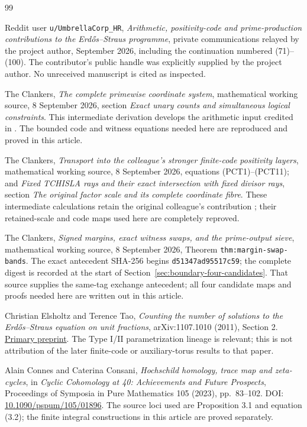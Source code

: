 \begin{thebibliography}{99}
\raggedright
{}
Reddit user \texttt{u/UmbrellaCorp\_HR},
\emph{Arithmetic, positivity-code and prime-production contributions to the
Erd\H{o}s--Straus programme}, private communications relayed by the project
author, September 2026, including the continuation numbered (71)--(100).
The contributor's public handle was explicitly supplied by the project author.
No unreceived manuscript is cited as inspected.

The Clankers, \emph{The complete primewise coordinate system},
mathematical working source, 8 September 2026, section
\emph{Exact unary counts and simultaneous logical constraints}.
This intermediate derivation develops the arithmetic input credited
in \cite{UmbrellaContribution}. The bounded code and witness equations
needed here are reproduced and proved in this article.

The Clankers, \emph{Transport into the colleague's stronger finite-code
positivity layers}, mathematical working source, 8 September 2026,
equations (PCT1)--(PCT11); and \emph{Fixed TCHISLA rays and their exact
intersection with fixed divisor rays}, section
\emph{The original factor scale and its complete coordinate fibre}.
These intermediate calculations retain the original colleague's contribution
\cite{UmbrellaContribution}; their retained-scale and code maps used here
are completely reproved.

The Clankers, \emph{Signed margins, exact witness swaps, and the
prime-output sieve}, mathematical working source, 8 September 2026,
Theorem \texttt{thm:margin-swap-bands}.
The exact antecedent SHA-256 begins \texttt{d51347ad95517c59};
the complete digest is recorded at the start of
Section~\ref{sec:boundary-four-candidates}.
That source supplies the same-tag exchange antecedent; all four
candidate maps and proofs needed here are written out in this article.

Christian Elsholtz and Terence Tao,
\emph{Counting the number of solutions to the Erd\H{o}s--Straus equation
on unit fractions}, arXiv:1107.1010 (2011), Section 2.
\href{https://arxiv.org/abs/1107.1010}{Primary preprint}.
The Type I/II parametrization lineage is relevant; this is not attribution
of the later finite-code or auxiliary-torus results to that paper.

Alain Connes and Caterina Consani,
\emph{Hochschild homology, trace map and zeta-cycles},
in \emph{Cyclic Cohomology at 40: Achievements and Future Prospects},
Proceedings of Symposia in Pure Mathematics 105 (2023), pp.~83--102.
DOI: \href{https://doi.org/10.1090/pspum/105/01896}{10.1090/pspum/105/01896}.
The source loci used are Proposition 3.1 and equation (3.2); the finite
integral constructions in this article are proved separately.


\end{thebibliography}
